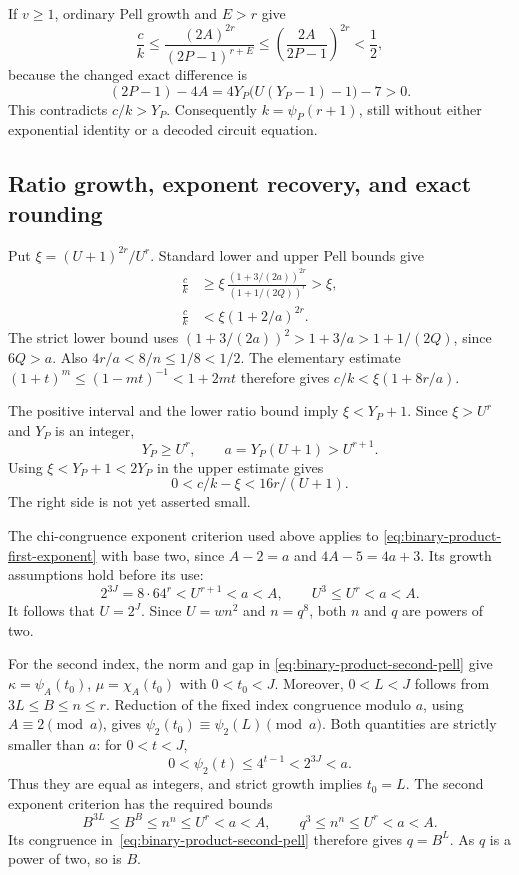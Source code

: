 If $v\ge1$, ordinary Pell growth and $E>r$ give
\[
 \frac ck
 \le\frac{(2A)^{2r}}{(2P-1)^{r+E}}
 \le\left(\frac{2A}{2P-1}\right)^{2r}<\frac12,
\]
because the changed exact difference is
\begin{equation}\label{eq:binary-product-index-exclusion}
 (2P-1)-4A=4Y_P\bigl(U(Y_P-1)-1\bigr)-7>0.
\end{equation}
This contradicts $c/k>Y_P$. Consequently $k=\psi_P(r+1)$, still
without either exponential identity or a decoded circuit equation.

\subsection{Ratio growth, exponent recovery, and exact rounding}

Put $\xi=(U+1)^{2r}/U^r$. Standard lower and upper Pell bounds give
\begin{equation}\label{eq:binary-product-ratio}
\begin{aligned}
 \frac ck
 &\ge \xi\,
   \frac{(1+3/(2a))^{2r}}{(1+1/(2Q))^r}>\xi,\\
 \frac ck&<\xi(1+2/a)^{2r}.
\end{aligned}
\end{equation}
The strict lower bound uses
$(1+3/(2a))^2>1+3/a>1+1/(2Q)$, since $6Q>a$.
Also
$4r/a<8/n\le1/8<1/2$. The elementary estimate
$(1+t)^m\le(1-mt)^{-1}<1+2mt$ therefore gives
$c/k<\xi(1+8r/a)$.

The positive interval and the lower ratio bound imply $\xi<Y_P+1$.
Since $\xi>U^r$ and $Y_P$ is an integer,
\begin{equation}\label{eq:binary-product-ratio-growth}
 Y_P\ge U^r,\qquad a=Y_P(U+1)>U^{r+1}.
\end{equation}
Using $\xi<Y_P+1<2Y_P$ in the upper estimate gives
\begin{equation}\label{eq:binary-product-ratio-error}
 0<c/k-\xi<16r/(U+1).
\end{equation}
The right side is not yet asserted small.

The chi-congruence exponent criterion used above applies to
\eqref{eq:binary-product-first-exponent} with base two, since
$A-2=a$ and $4A-5=4a+3$. Its growth assumptions hold before its use:
\[
 2^{3J}=8\cdot64^r<U^{r+1}<a<A,\qquad
 U^3\le U^r<a<A.
\]
It follows that $U=2^J$. Since $U=wn^2$ and $n=q^8$, both $n$ and
$q$ are powers of two.

For the second index, the norm and gap in
\eqref{eq:binary-product-second-pell} give
$\kappa=\psi_A(t_0)$, $\mu=\chi_A(t_0)$ with $0<t_0<J$. Moreover,
$0<L<J$ follows from $3L\le B\le n\le r$. Reduction of the fixed
index congruence modulo $a$, using $A\equiv2\pmod a$, gives
$\psi_2(t_0)\equiv\psi_2(L)\pmod a$. Both quantities are strictly
smaller than $a$: for $0<t<J$,
\[
 0<\psi_2(t)\le4^{t-1}<2^{3J}<a.
\]
Thus they are equal as integers, and strict growth implies $t_0=L$.
The second exponent criterion has the required bounds
\[
 B^{3L}\le B^B\le n^n\le U^r<a<A,\qquad
 q^3\le n^n\le U^r<a<A.
\]
Its congruence in~\eqref{eq:binary-product-second-pell} therefore
gives $q=B^L$. As $q$ is a power of two, so is $B$.

